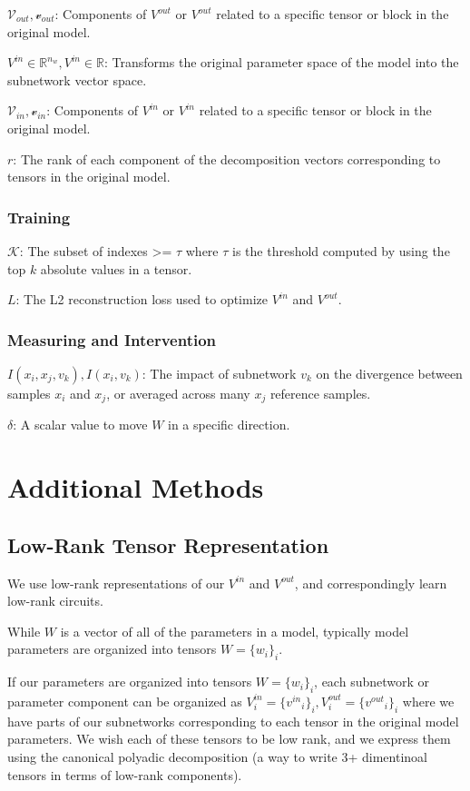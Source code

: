 \documentclass{article}
\theoremstyle{plain}
\theoremstyle{definition}
\theoremstyle{remark}
\begin{document}
$\mathcal{V}_{out}, \mathcal{v}_{out}$: Components of $V^{out}$ or $V^{out}$ related to a specific tensor or block in the original model. 

$V^{in} \in \mathbb{R}^{n_w}, V^{in} \in \mathbb{R}$: Transforms the original parameter space of the model into the subnetwork vector space. 

$\mathcal{V}_{in}, \mathcal{v}_{in}$: Components of $V^{in}$ or $V^{in}$ related to a specific tensor or block in the original model. 

$r$: The rank of each component of the decomposition vectors corresponding to tensors in the original model. 

\subsubsection{Training}

$\mathcal{K}$: The subset of indexes >= $\tau$ where $\tau$ is the threshold computed by using the top $k$ absolute values in a tensor. 

$L$: The L2 reconstruction loss used to optimize $V^{in}$ and $V^{out}$.

\subsubsection{Measuring and Intervention}
$I(x_i, x_j, v_k), I(x_i, v_k)$: The impact of subnetwork $v_k$ on the divergence between samples $x_i$ and $x_j$, or averaged across many $x_j$ reference samples.

$\delta$: A scalar value to move $W$ in a specific direction. 


\section{Additional Methods}

\subsection{Low-Rank Tensor Representation}\label{sec:low_rank}

We use low-rank representations of our $V^{in}$ and $V^{out}$, and correspondingly learn low-rank circuits.

While $W$ is a vector of all of the parameters in a model, typically model parameters are organized into tensors $W=\{w_i\}_i$. 

If our parameters are organized into tensors $W=\{w_i\}_i$, each subnetwork or parameter component can be organized as $V^{in}_i  = {\{{v^{in}}_i\}}_i, V^{out}_i = {\{{v^{out}}_i\}}_i$ where we have parts of our subnetworks corresponding to each tensor in the original model parameters. We wish each of these tensors to be low rank, and we express them using the canonical polyadic decomposition \cite{} (a way to write 3+ dimentinoal tensors in terms of low-rank components).
\end{document}
